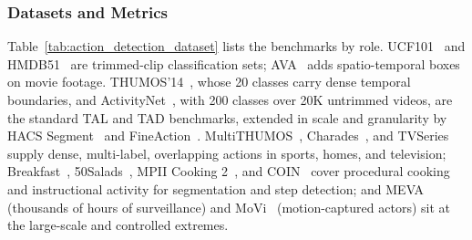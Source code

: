 \subsubsection{Datasets and Metrics}
Table~\ref{tab:action_detection_dataset} lists the benchmarks by role. UCF101~\cite{soomro2012ucf101} and HMDB51~\cite{kuehne2011hmdb} are trimmed-clip classification sets; AVA~\cite{gu2018ava} adds spatio-temporal boxes on movie footage. THUMOS'14~\cite{jiang2014thumos}, whose 20 classes carry dense temporal boundaries, and ActivityNet~\cite{caba2015activitynet}, with 200 classes over 20K untrimmed videos, are the standard TAL and TAD benchmarks, extended in scale and granularity by HACS Segment~\cite{zhao2019hacs} and FineAction~\cite{liu2022fineaction}. MultiTHUMOS~\cite{yeung2018every}, Charades~\cite{sigurdsson2016hollywood}, and TVSeries~\cite{de2016online} supply dense, multi-label, overlapping actions in sports, homes, and television; Breakfast~\cite{kuehne2014language}, 50Salads~\cite{stein2013combining}, MPII Cooking 2~\cite{rohrbach2016recognizing}, and COIN~\cite{tang2019coin} cover procedural cooking and instructional activity for segmentation and step detection; and MEVA~\cite{corona2021meva} (thousands of hours of surveillance) and MoVi~\cite{ghorbani2021movi} (motion-captured actors) sit at the large-scale and controlled extremes.

